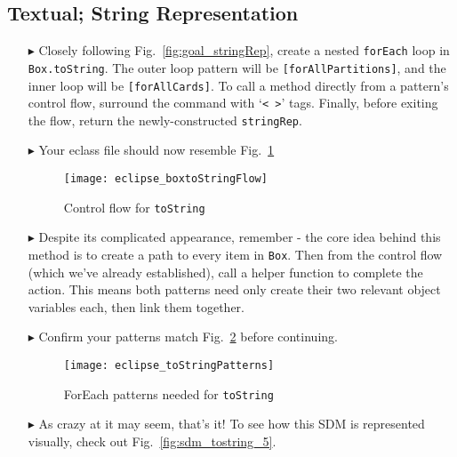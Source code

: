 \newpage
\subsection{Textual; String Representation}
\texHeader
\hypertarget{stringRep tex}{}

\vspace{0.5cm}

\begin{itemize}
  
\item[$\blacktriangleright$] Closely following Fig.~\ref{fig:goal_stringRep}, create a nested \texttt{forEach} loop in \texttt{Box.toString}. The outer loop
pattern will be \texttt{[forAllPartitions]}, and the inner loop will be \texttt{[forAllCards]}. To call a method directly from a pattern's control flow,
surround the command with `\texttt{< >}' tags. Finally, before exiting the flow, return the newly-constructed \texttt{stringRep}.

\vspace{0.5cm}

\item[$\blacktriangleright$] Your eclass file should now resemble Fig.~\ref{fig:toStringFlow}

\vspace{0.5cm}

\begin{figure}[htp]
\begin{center}
  \texttt{[image: eclipse\_boxtoStringFlow]}
  \caption{Control flow for \texttt{toString}}
  \label{fig:toStringFlow}
\end{center}
\end{figure}

\vspace{0.5cm}

\item[$\blacktriangleright$] Despite its complicated appearance, remember - the core idea behind this method is to create a path to every item in
\texttt{Box}. Then from the control flow (which we've already established), call a helper function to complete the action. This means both patterns need only
create their two relevant object variables each, then link them together.

\item[$\blacktriangleright$] Confirm your patterns match Fig.~\ref{fig:toStringPatterns} before continuing.

\begin{figure}[htp]
\begin{center}
  \texttt{[image: eclipse\_toStringPatterns]}
  \caption{ForEach patterns needed for \texttt{toString}}
  \label{fig:toStringPatterns}
\end{center}
\end{figure}

\vspace{0.5cm}

\item[$\blacktriangleright$] As crazy at it may seem, that's it!  To
see how this SDM is represented visually, check out Fig.~\ref{fig:sdm_tostring_5}.

\end{itemize}
